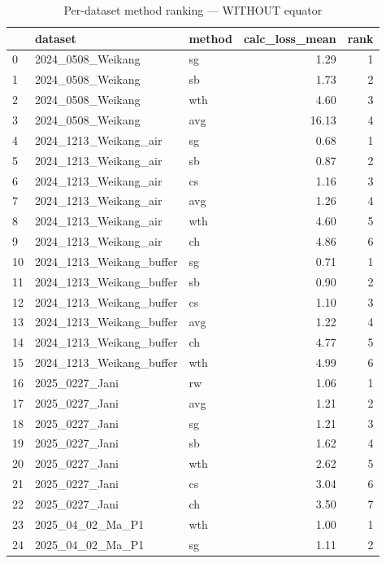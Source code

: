 \documentclass{article}
\begin{document}
\begin{table}[ht]
\centering
\caption{Per-dataset method ranking --- WITHOUT equator}
\begin{tabular}{lllrr}
\toprule
 & dataset & method & calc\_loss\_mean & rank \\
\midrule
0  & 2024\_0508\_Weikang        & sg  & 1.29 & 1 \\
1  & 2024\_0508\_Weikang        & sb  & 1.73 & 2 \\
2  & 2024\_0508\_Weikang        & wth & 4.60 & 3 \\
3  & 2024\_0508\_Weikang        & avg & 16.13 & 4 \\
4  & 2024\_1213\_Weikang\_air    & sg  & 0.68 & 1 \\
5  & 2024\_1213\_Weikang\_air    & sb  & 0.87 & 2 \\
6  & 2024\_1213\_Weikang\_air    & cs  & 1.16 & 3 \\
7  & 2024\_1213\_Weikang\_air    & avg & 1.26 & 4 \\
8  & 2024\_1213\_Weikang\_air    & wth & 4.60 & 5 \\
9  & 2024\_1213\_Weikang\_air    & ch  & 4.86 & 6 \\
10 & 2024\_1213\_Weikang\_buffer & sg  & 0.71 & 1 \\
11 & 2024\_1213\_Weikang\_buffer & sb  & 0.90 & 2 \\
12 & 2024\_1213\_Weikang\_buffer & cs  & 1.10 & 3 \\
13 & 2024\_1213\_Weikang\_buffer & avg & 1.22 & 4 \\
14 & 2024\_1213\_Weikang\_buffer & ch  & 4.77 & 5 \\
15 & 2024\_1213\_Weikang\_buffer & wth & 4.99 & 6 \\
16 & 2025\_0227\_Jani           & rw  & 1.06 & 1 \\
17 & 2025\_0227\_Jani           & avg & 1.21 & 2 \\
18 & 2025\_0227\_Jani           & sg  & 1.21 & 3 \\
19 & 2025\_0227\_Jani           & sb  & 1.62 & 4 \\
20 & 2025\_0227\_Jani           & wth & 2.62 & 5 \\
21 & 2025\_0227\_Jani           & cs  & 3.04 & 6 \\
22 & 2025\_0227\_Jani           & ch  & 3.50 & 7 \\
23 & 2025\_04\_02\_Ma\_P1         & wth & 1.00 & 1 \\
24 & 2025\_04\_02\_Ma\_P1         & sg  & 1.11 & 2 \\

\end{tabular}
\end{table}
\end{document}
